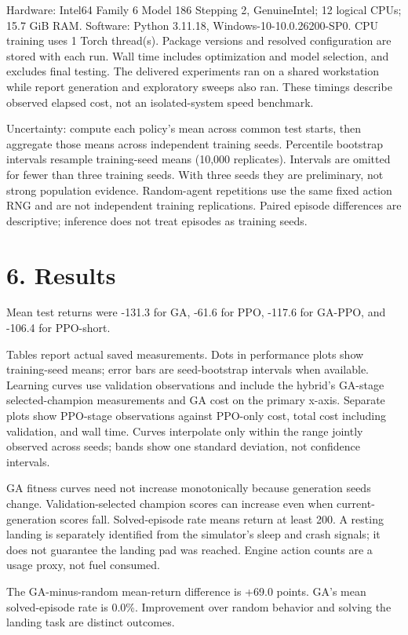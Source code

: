 \documentclass[11pt,a4paper]{article}
\begin{document}
Hardware: Intel64 Family 6 Model 186 Stepping 2, GenuineIntel; 12 logical CPUs; 15.7 GiB RAM. Software: Python 3.11.18, Windows-10-10.0.26200-SP0. CPU training uses 1 Torch thread(s). Package versions and resolved configuration are stored with each run. Wall time includes optimization and model selection, and excludes final testing. The delivered experiments ran on a shared workstation while report generation and exploratory sweeps also ran. These timings describe observed elapsed cost, not an isolated-system speed benchmark.

Uncertainty: compute each policy's mean across common test starts, then aggregate those means across independent training seeds. Percentile bootstrap intervals resample training-seed means (10,000 replicates). Intervals are omitted for fewer than three training seeds. With three seeds they are preliminary, not strong population evidence. Random-agent repetitions use the same fixed action RNG and are not independent training replications. Paired episode differences are descriptive; inference does not treat episodes as training seeds.

\section*{6. Results}
Mean test returns were -131.3 for GA, -61.6 for PPO, -117.6 for GA-PPO, and -106.4 for PPO-short.

Tables report actual saved measurements. Dots in performance plots show training-seed means; error bars are seed-bootstrap intervals when available. Learning curves use validation observations and include the hybrid's GA-stage selected-champion measurements and GA cost on the primary x-axis. Separate plots show PPO-stage observations against PPO-only cost, total cost including validation, and wall time. Curves interpolate only within the range jointly observed across seeds; bands show one standard deviation, not confidence intervals.

GA fitness curves need not increase monotonically because generation seeds change. Validation-selected champion scores can increase even when current-generation scores fall. Solved-episode rate means return at least 200. A resting landing is separately identified from the simulator's sleep and crash signals; it does not guarantee the landing pad was reached. Engine action counts are a usage proxy, not fuel consumed.

The GA-minus-random mean-return difference is +69.0 points. GA's mean solved-episode rate is 0.0\%. Improvement over random behavior and solving the landing task are distinct outcomes.
\end{document}
